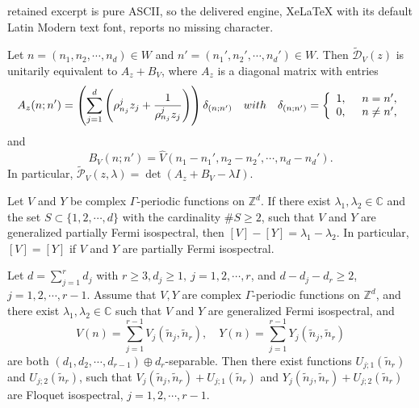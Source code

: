 \documentclass[10pt,a4paper]{amsart}
\def\C{{\mathbb C}}
\def\Z{{\mathbb Z}}
\begin{document}
retained excerpt is pure ASCII, so the delivered engine, XeLaTeX with its default Latin Modern text font, reports no missing character.
\begin{lemma} \label{lemunitary}Let $n=(n_1,n_2,\cdots,n_d)\in W$ and $n'=(n_1',n_2',\cdots,n_d')\in W$. Then $\tilde{\mathcal{D}}_V(z)$ is unitarily equivalent to $A_z+B_V$, where $A_z$ is a diagonal matrix with entries
\[A_z(n;n')=\left(\sum_{j=1}^d\left(\rho^j_{n_j}z_j+\frac{1}{\rho^j_{n_j}z_j}\right)\right)\delta_{(n;n')}\quad {\rm with}\quad \delta_{(n;n')}=\left\{\begin{array}{l}
	1, \quad\  n=n',\\
	0,~\quad n\neq n',
\end{array}\right.\]
and
\[B_V(n;n')=\hat{V}(n_1-n_1',n_2-n_2',\cdots,n_d-n_d').\]
In particular, $\tilde{\mathcal{P}}_V(z,\lambda)=\det(A_z+B_V-\lambda I).$
\end{lemma}

\begin{theorem}\label{v-yequlambda1-2}
Let $V$ and $Y$ be complex $\Gamma$-periodic functions on $\Z^d$. If there exist $\lambda_1,\lambda_2\in\C$ and the set $S\subset\{1,2,\cdots,d\}$ with the cardinality $\# S\geq 2$, such that $V$ and $Y$ are generalized partially Fermi isospectral,
then $[V]-[Y]=\lambda_1-\lambda_2$. {In particular, $[V]=[Y]$ if $V$ and $Y$ are  partially Fermi isospectral.}
\end{theorem}

{\begin{theorem}\label{maintheorem325fer}
Let $d=\sum_{j=1}^rd_j$ with $r\geq 3,d_j\geq 1,\ j=1,2,\cdots,r$, and $d-d_j-d_r\geq 2$, $j=1,2,\cdots,r-1$.
Assume that $V,Y$ are complex $\Gamma$-periodic functions on $\mathbb{Z}^d$, and there exist $\lambda_1,\lambda_2\in\C$ such that $V$ and $Y$ are generalized Fermi isospectral, and
\[V(n)=\sum_{j=1}^{r-1} V_j(\tilde{n}_j,\tilde{n}_r),\quad Y(n)=\sum_{j=1}^{r-1} Y_j(\tilde{n}_j,\tilde{n}_r)\] are both $(d_1,d_2,\cdots,d_{r-1})\oplus d_r$-separable. Then there exist functions $U_{j;1}(\tilde{n}_r)$ and $U_{j;2}(\tilde{n}_r)$, such that $V_j(\tilde{n}_{j},\tilde{n}_r)+U_{j;1}(\tilde{n}_r)$ and $Y_j(\tilde{n}_{j},\tilde{n}_r)+U_{j;2}(\tilde{n}_r)$ are Floquet isospectral, $j=1,2,\cdots,r-1$.
\end{theorem}}
\end{document}
